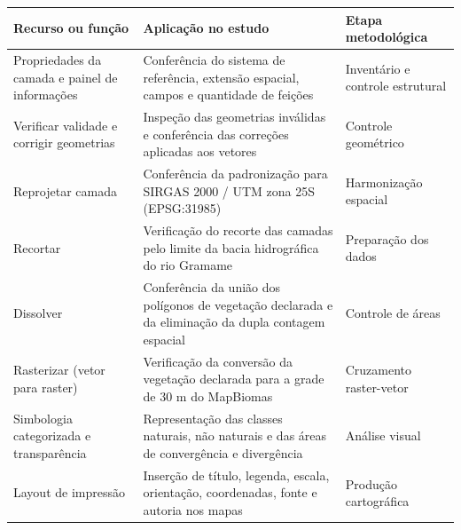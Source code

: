 \begin{quadro}[H]
\centering
\caption{Recursos e funções do QGIS empregados no estudo}
\label{qua:qgis}

\begingroup
\small
\SingleSpacing
\renewcommand{\arraystretch}{1.35}
\setlength{\tabcolsep}{5pt}

\begin{tabularx}{\textwidth}{
>{\RaggedRight\arraybackslash}p{3.4cm}
>{\RaggedRight\arraybackslash}X
>{\RaggedRight\arraybackslash}p{3.0cm}
}
\toprule
\textbf{Recurso ou função} & \textbf{Aplicação no estudo} & \textbf{Etapa metodológica} \\
\midrule

Propriedades da camada e painel de informações &
Conferência do sistema de referência, extensão espacial, campos e quantidade de feições &
Inventário e controle estrutural \\

Verificar validade e corrigir geometrias &
Inspeção das geometrias inválidas e conferência das correções aplicadas aos vetores &
Controle geométrico \\

Reprojetar camada &
Conferência da padronização para SIRGAS 2000 / UTM zona 25S (EPSG:31985) &
Harmonização espacial \\

Recortar &
Verificação do recorte das camadas pelo limite da bacia hidrográfica do rio Gramame &
Preparação dos dados \\

Dissolver &
Conferência da união dos polígonos de vegetação declarada e da eliminação da dupla contagem espacial &
Controle de áreas \\

Rasterizar (vetor para raster) &
Verificação da conversão da vegetação declarada para a grade de 30 m do MapBiomas &
Cruzamento raster-vetor \\

Simbologia categorizada e transparência &
Representação das classes naturais, não naturais e das áreas de convergência e divergência &
Análise visual \\

Layout de impressão &
Inserção de título, legenda, escala, orientação, coordenadas, fonte e autoria nos mapas &
Produção cartográfica \\

\bottomrule
\end{tabularx}

\vspace{0.20cm}
\endgroup
\end{quadro}

